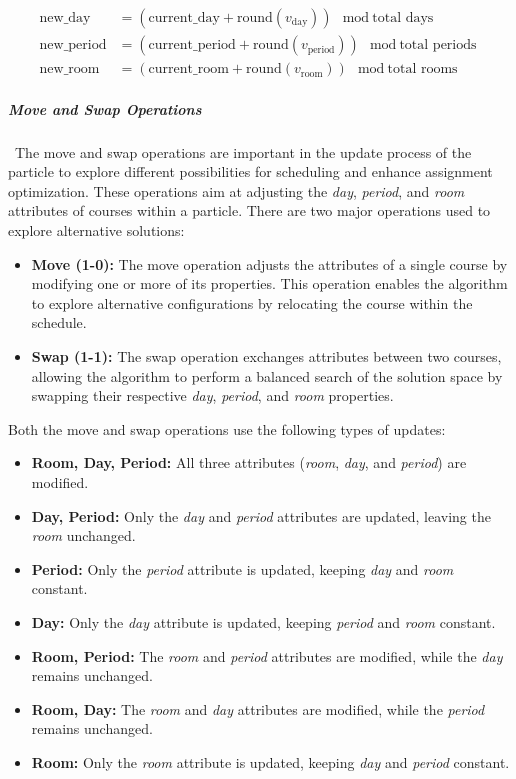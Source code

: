 \begin{align*}
\text{new\_day} &= (\text{current\_day} + \text{round}(v_{\text{day}})) \mod \text{total days} \\
\text{new\_period} &= (\text{current\_period} + \text{round}(v_{\text{period}})) \mod \text{total periods} \\
\text{new\_room} &= (\text{current\_room} + \text{round}(v_{\text{room}})) \mod \text{total rooms}
\end{align*}

\subparagraph{Move and Swap Operations}\
The move and swap operations are important in the update process of the particle to explore different possibilities for scheduling and enhance assignment optimization. These operations aim at adjusting the \textit{day}, \textit{period}, and \textit{room} attributes of courses within a particle. There are two major operations \cite{yang2015discrete} used to explore alternative solutions:

\begin{itemize}
    \item \textbf{Move (1-0):} The move operation adjusts the attributes of a single course by modifying one or more of its properties. This operation enables the algorithm to explore alternative configurations by relocating the course within the schedule.

    \item \textbf{Swap (1-1):} The swap operation exchanges attributes between two courses, allowing the algorithm to perform a balanced search of the solution space by swapping their respective \textit{day}, \textit{period}, and \textit{room} properties.

\end{itemize}

Both the move and swap operations use the following types of updates:

\begin{itemize}
    \item \textbf{Room, Day, Period:} All three attributes (\textit{room}, \textit{day}, and \textit{period}) are modified.
    \item \textbf{Day, Period:} Only the \textit{day} and \textit{period} attributes are updated, leaving the \textit{room} unchanged.
    \item \textbf{Period:} Only the \textit{period} attribute is updated, keeping \textit{day} and \textit{room} constant.
    \item \textbf{Day:} Only the \textit{day} attribute is updated, keeping \textit{period} and \textit{room} constant.
    \item \textbf{Room, Period:} The \textit{room} and \textit{period} attributes are modified, while the \textit{day} remains unchanged.
    \item \textbf{Room, Day:} The \textit{room} and \textit{day} attributes are modified, while the \textit{period} remains unchanged.
    \item \textbf{Room:} Only the \textit{room} attribute is updated, keeping \textit{day} and \textit{period} constant.
\end{itemize}

